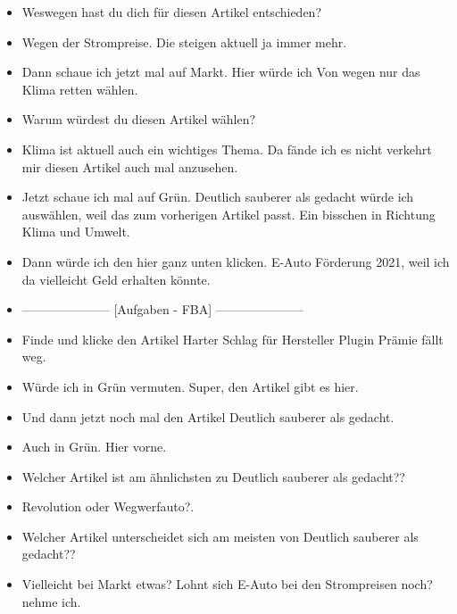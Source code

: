 {\begin{itemize}[]
                  Also \flqq Lohnt sich E-Auto bei den Strompreisen noch\frqq{}.
            \item {} Weswegen hast du dich für diesen Artikel entschieden?
            \item {} Wegen der Strompreise. Die steigen aktuell ja immer mehr.
            \item {} Dann schaue ich jetzt mal auf Markt.
                  Hier würde ich \flqq Von wegen nur das Klima retten\frqq{} wählen.
            \item {} Warum würdest du diesen Artikel wählen?
            \item {} Klima ist aktuell auch ein wichtiges Thema. Da fände ich es nicht verkehrt mir diesen Artikel auch mal anzusehen.
            \item {} Jetzt schaue ich mal auf Grün.
                  \flqq Deutlich sauberer als gedacht\frqq{} würde ich auswählen, weil das zum vorherigen Artikel passt.
                  Ein bisschen in Richtung Klima und Umwelt.
            \item {} Dann würde ich den hier ganz unten klicken. \flqq E-Auto Förderung 2021\frqq{}, weil ich da vielleicht Geld erhalten könnte.
            \item {---------------------} [Aufgaben - FBA] {---------------------}
            \item {} Finde und klicke den Artikel \flqq Harter Schlag für Hersteller Plugin Prämie fällt weg\frqq{}.
            \item {} Würde ich in Grün vermuten. Super, den Artikel gibt es hier.
            \item {} Und dann jetzt noch mal den Artikel \flqq Deutlich sauberer als gedacht\frqq{}.
            \item {} Auch in Grün. Hier vorne.
            \item {} Welcher Artikel ist am ähnlichsten zu \flqq Deutlich sauberer als gedacht?\frqq{}?
            \item {} \flqq Revolution oder Wegwerfauto?\frqq{}.
            \item {} Welcher Artikel unterscheidet sich am meisten von \flqq Deutlich sauberer als gedacht?\frqq{}?
            \item {} Vielleicht bei Markt etwas?
                  \flqq Lohnt sich E-Auto bei den Strompreisen noch?\frqq{} nehme ich.

\end{itemize}}
